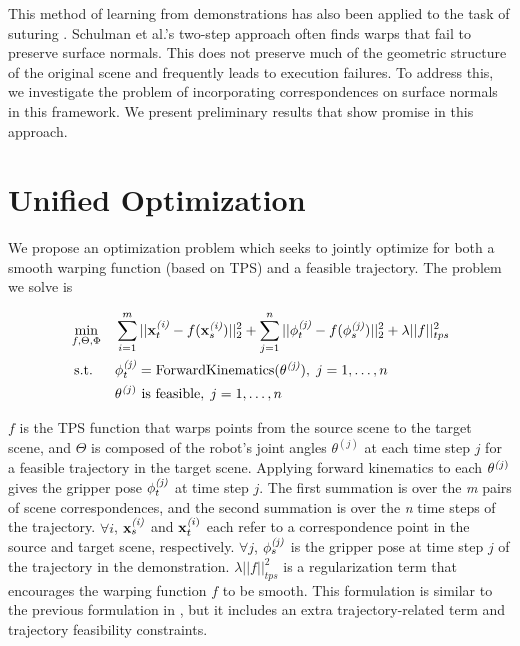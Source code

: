 \documentclass{article}
\begin{document}
This method of learning from demonstrations has also been applied to the task of suturing \cite{Schulmanetal_IROS2013}. Schulman et al.'s two-step approach often finds warps that fail to preserve surface normals. This does not preserve much of the geometric structure of the original scene and frequently leads to execution failures. To address this, we investigate the problem of incorporating correspondences on surface normals in this framework. We present preliminary results that show promise in this approach.


\section{Unified Optimization}

We propose an optimization problem which seeks to jointly optimize for both a smooth warping function (based on TPS) and a feasible trajectory. The problem we solve is

\begin{equation}
\begin{aligned}
  & \min_{f,\Theta,\Phi}
  & & \sum_{i=1}^m ||\mathbf{x}_t^{\emph{(i)}} - f(\mathbf{x}_s^{\emph{(i)}})||_2^2 + \sum_{j=1}^n ||\mathbf{\phi}_t^{\emph{(j)}} - f(\mathbf{\phi}_s^{\emph{(j)}})||_2^2 + \lambda ||f||_{tps}^2 \\
  & \text{ s.t.}
  & & \mathbf{\phi}_t^{\emph{(j)}} = \text{ForwardKinematics}(\mathbf{\theta}^{\emph{(j)}}), \; j = 1, \ldots, n \\
  &
  & & \mathbf{\theta}^{\emph(j)} \text{ is feasible}, \; j = 1, \ldots, n
\end{aligned}
\end{equation}

$f$ is the TPS function that warps points from the source scene to the target scene, and $\Theta$ is composed of the robot's joint angles $\theta^{(j)}$ at each time step $j$ for a feasible trajectory in the target scene. Applying forward kinematics to each $\mathbf{\theta}^{\emph(j)}$ gives the gripper pose $\mathbf{\phi}_t^{\emph{(j)}}$ at time step $j$. The first summation is over the \emph{m} pairs of scene correspondences, and the second summation is over the \emph{n} time steps of the trajectory. $\forall i$, $\mathbf{x}_s^{\emph{(i)}}$ and $\mathbf{x}_t^{\emph(i)}$ each refer to a correspondence point in the source and target scene, respectively. $\forall j$, $\mathbf{\phi}_s^{\emph{(j)}}$ is the gripper pose at time step $j$ of the trajectory in the demonstration. $\lambda ||f||_{tps}^2$ is a regularization term that encourages the warping function $f$ to be smooth. This formulation is similar to the previous formulation in \cite{Schulmanetal_ISRR2013}, but it includes an extra trajectory-related term and trajectory feasibility constraints.
\end{document}
